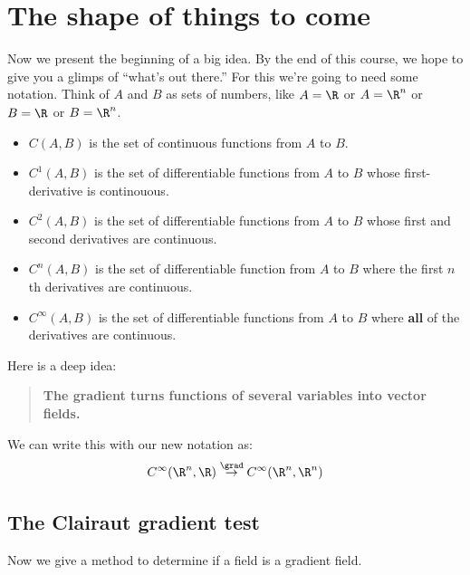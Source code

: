 \documentclass{ximera}
\begin{document}
\section{The shape of things to come}

Now we present the beginning of a big idea. By the end of this course,
we hope to give you a glimps of ``what's out there.'' For this we're
going to need some notation. Think of $A$ and $B$ as sets of numbers,
like $A=\R$ or $A=\R^n$ or $B=\R$ or $B=\R^n$.

\begin{itemize}
\item $C(A,B)$ is the set of continuous functions from $A$ to $B$.
\item $C^1(A,B)$ is the set of  differentiable functions from $A$ to $B$ whose
  first-derivative is continouous.
\item $C^2(A,B)$ is the set of  differentiable functions from $A$ to $B$ whose
  first and second derivatives are continuous.
\item $C^n(A,B)$ is the set of differentiable function from $A$ to $B$
  where the first $n$th derivatives are continuous.
\item $C^\infty(A,B)$ is the set of differentiable functions from $A$
  to $B$ where \textbf{all} of the derivatives are continuous.
\end{itemize}
Here is a deep idea:
\begin{quote}
  \textbf{The gradient turns functions of several variables into vector fields.}
\end{quote}
We can write this with our new notation as: 
\[
C^\infty(\R^n,\R)\overset{\grad}{\to}C^\infty(\R^n,\R^n)
\]


\subsection{The Clairaut gradient test}


Now we give a method to determine if a field is a gradient field. 
\end{document}
